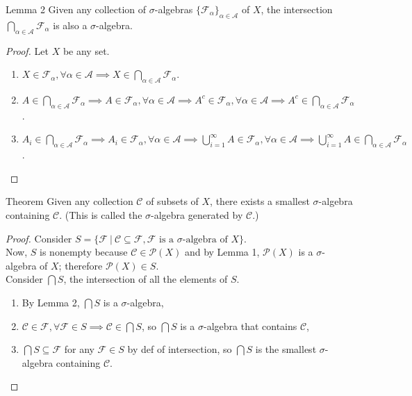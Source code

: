 \begin{flushleft}
	\begin{namedthm*}{Lemma 2}
		Given any collection of $\sigma$-algebras $\{\mathcal{F}_\alpha\}_{\alpha\in\mathcal{A}}$ of $X$, the intersection $\bigcap_{\alpha\in\mathcal{A}}\mathcal{F}_\alpha$ is also a $\sigma$-algebra.
	\end{namedthm*}
	\begin{proof}
		Let $X$ be any set.
		\begin{enumerate}[label=(\roman*),align=left]   
			\item $X\in\mathcal{F}_\alpha,\forall\alpha\in\mathcal{A}\implies X\in\bigcap_{\alpha\in\mathcal{A}}\mathcal{F}_\alpha$.
			\item $A\in\bigcap_{\alpha\in\mathcal{A}}\mathcal{F}_\alpha\implies A\in\mathcal{F}_\alpha,\forall\alpha\in\mathcal{A}\implies A^c\in\mathcal{F}_\alpha,\forall\alpha\in\mathcal{A}\implies A^c\in\bigcap_{\alpha\in\mathcal{A}}\mathcal{F}_\alpha$.
			\item $A_i\in\bigcap_{\alpha\in\mathcal{A}}\mathcal{F}_\alpha\implies A_i\in\mathcal{F}_\alpha,\forall\alpha\in\mathcal{A}\implies \bigcup_{i=1}^\infty A\in\mathcal{F}_\alpha,\forall\alpha\in\mathcal{A}\implies \bigcup_{i=1}^\infty A\in\bigcap_{\alpha\in\mathcal{A}}\mathcal{F}_\alpha$.
		\end{enumerate}
	\end{proof}

	\begin{namedthm*}{Theorem}
		Given any collection $\mathcal{C}$ of subsets of $X$, there exists a smallest $\sigma$-algebra containing $\mathcal{C}$.
		(This is called the $\sigma$-algebra generated by $\mathcal{C}$.)
	\end{namedthm*}
	\begin{proof}
		Consider $S=\{\mathcal{F}\ |\ \mathcal{C}\subseteq\mathcal{F},\mathcal{F}\text{ is a }\sigma\text{-algebra of }X\}$.\\
		Now, $S$ is nonempty because $\mathcal{C}\in\mathcal{P}(X)$ and by Lemma 1, $\mathcal{P}(X)$ is a $\sigma$-algebra of $X$; therefore $\mathcal{P}(X)\in S$.\\
		Consider $\bigcap S$, the intersection of all the elements of $S$.\\
		\begin{enumerate}
			\item By Lemma 2, $\bigcap S$ is a $\sigma$-algebra,
			\item $\mathcal{C}\in\mathcal{F},\forall\mathcal{F}\in S\implies\mathcal{C}\in\bigcap S$, so $\bigcap S$ is a $\sigma$-algebra that contains $\mathcal{C}$,
			\item  $\bigcap S\subseteq \mathcal{F}$ for any $\mathcal{F}\in S$ by def of intersection, so $\bigcap S$ is the smallest $\sigma$-algebra containing $\mathcal{C}$.
		\end{enumerate}
	\end{proof}


\end{flushleft}
